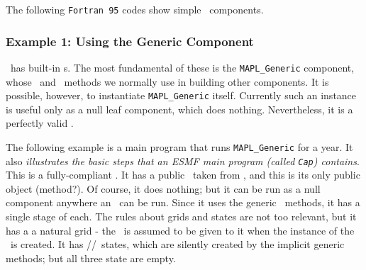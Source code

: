 
The following {\tt Fortran 95} codes show simple \ggn\ components.

\subsubsection{Example 1: Using the Generic Component}
\label{sec:ex1}

\ggn\ has built-in \egc s. The most fundamental of these is the 
\texttt{MAPL\_Generic} component, whose \ssv\ and \IRF\ methods we normally
use in building other components. It is possible, however, to instantiate
\texttt{MAPL\_Generic} itself. Currently such an instance is useful only
as a null leaf component, which does nothing. Nevertheless, it is a
perfectly valid \egc.

The following example is a main program that runs     
\texttt{MAPL\_Generic} for a year. It also \emph{illustrates the basic steps
that an ESMF main program (called \texttt{Cap}) contains}. This is a
fully-compliant \egc.
It has a public \ssv\  taken from \ggn, and this is its only
public object (method?). Of course, it does nothing; but it can be run as
a null component anywhere an \egc\  can be run. Since it uses the
generic \IRF\ methods, it has a single stage of each. The rules about
grids and states are not too relevant, but it has a a natural grid -
the \grd\ is assumed to be given to it when the instance of the \egc\
is created. It has \IM/\EX/\gIN\ states, which are silently created by
the implicit generic methods; but all three state are empty.

\footnotesize

